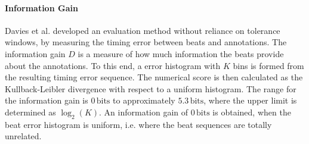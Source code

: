 \documentclass{scrartcl}
\begin{document}
\paragraph{Information Gain}
Davies et al. \cite{Davies2009b} developed an evaluation method without reliance on tolerance windows, by measuring the timing error between beats and annotations. The information gain $D$ is a measure of how much information the beats provide about the annotations. To this end, a error histogram with $K$ bins is formed from the resulting timing error sequence. The numerical score is then calculated as the Kullback-Leibler divergence with respect to a uniform histogram. The range for the information gain is $0\,\text{bits}$ to approximately $5.3\,\text{bits}$, where the upper limit is determined as $\log_2(K)$. An information gain of $0\,\text{bits}$ is obtained, when the beat error histogram is uniform, i.e. where the beat sequences are totally unrelated.





\end{document}
